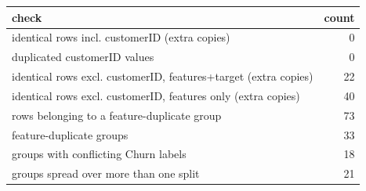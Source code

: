 \begin{tabular}{lr}
\toprule
check & count \\
\midrule
identical rows incl. customerID (extra copies) & 0 \\
duplicated customerID values & 0 \\
identical rows excl. customerID, features+target (extra copies) & 22 \\
identical rows excl. customerID, features only (extra copies) & 40 \\
rows belonging to a feature-duplicate group & 73 \\
feature-duplicate groups & 33 \\
groups with conflicting Churn labels & 18 \\
groups spread over more than one split & 21 \\
\bottomrule
\end{tabular}
